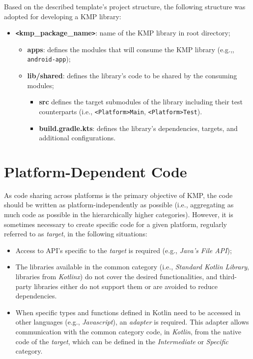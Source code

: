 Based on the described template's project structure, the following structure was adopted for developing a KMP library:

\begin{itemize}
    \item \textbf{\texttt{<}kmp\_package\_name\texttt{>}}: name of the KMP library in root directory;
    \begin{itemize}
        \item \textbf{apps}: defines the modules that will consume the KMP library (e.g.,, \texttt{android-app});
        \item \textbf{lib/shared}: defines the library's code to be shared by the consuming modules;
        \begin{itemize}
            \item \textbf{src} defines the target submodules of the library including their test counterparts (i.e., \texttt{<Platform>Main}, \texttt{<Platform>Test}).
            \item \textbf{build.gradle.kts}: defines the library's dependencies, targets, and additional configurations.
        \end{itemize}
    \end{itemize}
\end{itemize}


\section{Platform-Dependent Code}\label{sec:platform-dependent-code}

As code sharing across platforms is the primary objective of KMP, the code should be written as platform-independently as possible (i.e., aggregating as much code as possible in the hierarchically higher categories).
However, it is sometimes necessary to create specific code for a given platform, regularly referred to as \textit{target}, in the following situations:

\begin{itemize}
    \item Access to API's specific to the \textit{target} is required (e.g., \textit{Java's File API});
    \item The libraries available in the common category (i.e., \textit{Standard Kotlin Library}, libraries from \textit{Kotlinx}) do not cover the desired functionalities, and third-party libraries either do not support them or are avoided to reduce dependencies.
    \item When specific types and functions defined in Kotlin need to be accessed in other languages (e.g., \textit{Javascript}), an \textit{adapter} is required.
    This adapter allows communication with the common category code, in \textit{Kotlin}, from the native code of the \textit{target}, which can be defined in the \textit{Intermediate} or \textit{Specific} category.
\end{itemize}

